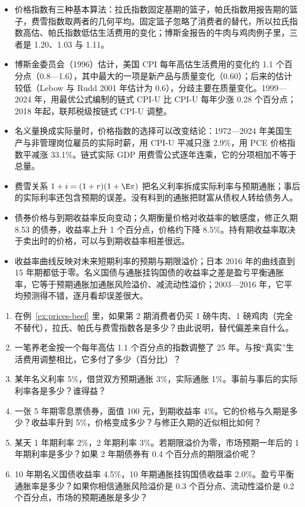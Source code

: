 \begin{takeaways}
\begin{itemize}
\item 价格指数有三种基本算法：拉氏指数固定基期的篮子，帕氏指数用报告期的篮子，费雪指数取两者的几何平均。固定篮子忽略了消费者的替代，所以拉氏指数高估、帕氏指数低估生活费用的变化；博斯金报告的牛肉与鸡肉例子里，三者是 1.20、1.03 与 1.11。
\item 博斯金委员会（1996）估计，美国 CPI 每年高估生活费用的变化约 1.1 个百分点（0.8—1.6），其中最大的一项是新产品与质量变化（0.60）；后来的估计较低（Lebow 与 Rudd 2001 年估计为 0.6），分歧主要在质量变化。1999—2024 年，用最优公式编制的链式 CPI-U 比 CPI-U 每年少涨 0.28 个百分点；2018 年起，联邦税级按链式 CPI-U 调整。
\item 名义量换成实际量时，价格指数的选择可以改变结论：1972—2024 年美国生产与非管理岗位雇员的实际时薪，用 CPI-U 平减只涨 2.9\%，用 PCE 价格指数平减涨 33.1\%。链式实际 GDP 用费雪公式逐年连乘，它的分项相加不等于总量。
\item 费雪关系 $1+i=(1+r)(1+\E\pi)$ 把名义利率拆成实际利率与预期通胀；事后的实际利率还包含预期的误差。没有料到的通胀把财富从债权人转给债务人。
\item 债券价格与到期收益率反向变动；久期衡量价格对收益率的敏感度，修正久期 8.53 的债券，收益率上升 1 个百分点，价格约下降 8.5\%。持有期收益率取决于卖出时的价格，可以与到期收益率相差很远。
\item 收益率曲线反映对未来短期利率的预期与期限溢价；日本 2016 年的曲线直到 15 年期都低于零。名义国债与通胀挂钩国债的收益率之差是盈亏平衡通胀率，它等于预期通胀加通胀风险溢价、减流动性溢价；2003—2016 年，它平均预测得不错，逐月看却误差很大。
\end{itemize}
\end{takeaways}

\begin{selfcheck}
\begin{enumerate}
\item 在例~\ref{ex:prices-beef} 里，如果第 2 期消费者仍买 1 磅牛肉、1 磅鸡肉（完全不替代），拉氏、帕氏与费雪指数各是多少？由此说明，替代偏差来自什么。
\item 一笔养老金按一个每年高估 1.1 个百分点的指数调整了 25 年。与按“真实”生活费用调整相比，它多付了多少（百分比）？
\item 某年名义利率 5\%，借贷双方预期通胀 3\%，实际通胀 1\%。事前与事后的实际利率各是多少？谁得益？
\item 一张 5 年期零息票债券，面值 100 元，到期收益率 4\%。它的价格与久期是多少？收益率升到 5\%，价格变成多少？与修正久期的近似相比如何？
\item 某天 1 年期利率 2\%，2 年期利率 3\%。若期限溢价为零，市场预期一年后的 1 年期利率是多少？如果 2 年期债券有 0.4 个百分点的期限溢价呢？
\item 10 年期名义国债收益率 4.5\%，10 年期通胀挂钩国债收益率 2.0\%。盈亏平衡通胀率是多少？如果你相信通胀风险溢价是 0.3 个百分点、流动性溢价是 0.2 个百分点，市场的预期通胀是多少？
\end{enumerate}
\end{selfcheck}

